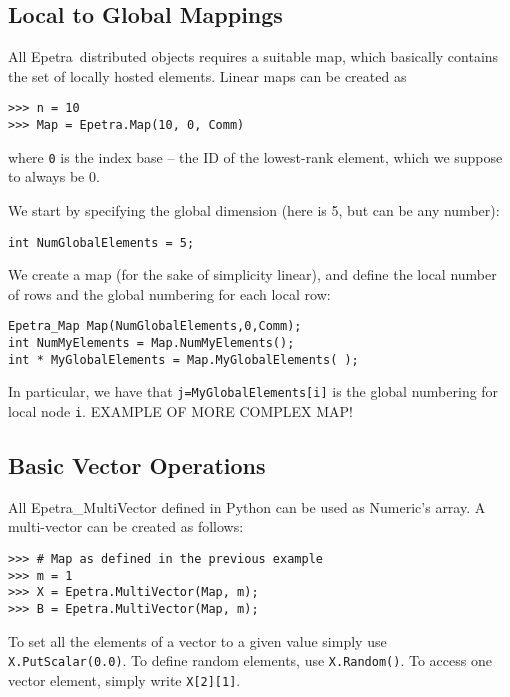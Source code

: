 \documentclass[10pt,relax]{SANDreport}
\newcommand{\epetra}{{Epetra}}
\begin{document}
\subsection{Local to Global Mappings}
\label{sec:maps}

All \epetra\ distributed objects requires a suitable map, which basically
contains the set of locally hosted elements. Linear maps can be created as
\begin{verbatim}
>>> n = 10
>>> Map = Epetra.Map(10, 0, Comm)
\end{verbatim}
where {\tt 0} is the index base -- the ID of the lowest-rank element, which we 
suppose to always be 0.

We start by specifying the global dimension (here is 5, but can be any
number):
\begin{verbatim}
int NumGlobalElements = 5;
\end{verbatim}

We create a map (for the sake of simplicity linear), and define the
local number of rows and the global numbering for each local row:
\begin{verbatim}
Epetra_Map Map(NumGlobalElements,0,Comm);
int NumMyElements = Map.NumMyElements();
int * MyGlobalElements = Map.MyGlobalElements( );
\end{verbatim}
In particular, we have that \verb!j=MyGlobalElements[i]! is the global
numbering for local node \verb!i!. 
EXAMPLE OF MORE COMPLEX MAP!

\subsection{Basic Vector Operations}
\label{sec:vectors}

All Epetra\_MultiVector defined in Python can be used as Numeric's array.
A multi-vector can be created as follows:
\begin{verbatim}
>>> # Map as defined in the previous example
>>> m = 1
>>> X = Epetra.MultiVector(Map, m);
>>> B = Epetra.MultiVector(Map, m);
\end{verbatim}
To set all the elements of a vector to a given value simply use {\tt
  X.PutScalar(0.0)}. To define random elements, use {\tt X.Random()}.
To access one vector element, simply write {\tt X[2][1]}.
\end{document}
